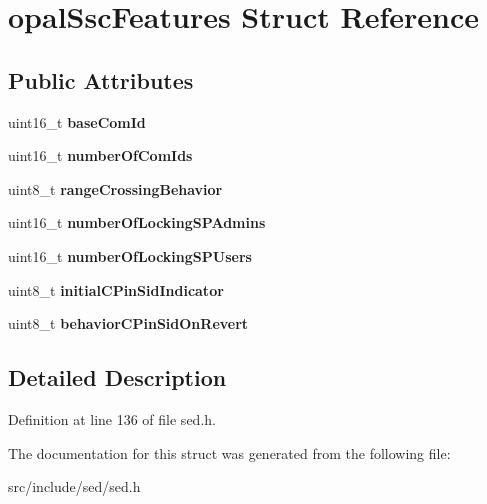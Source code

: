 \hypertarget{structopalSscFeatures}{}\section{opal\+Ssc\+Features Struct Reference}
\label{structopalSscFeatures}
\subsection*{Public Attributes}
\begin{DoxyCompactItemize}
\item 
\hypertarget{structopalSscFeatures_a061eedf0cad03b914e7ee83bfd2abd44}{}uint16\+\_\+t {\bfseries base\+Com\+Id}\label{structopalSscFeatures_a061eedf0cad03b914e7ee83bfd2abd44}

\item 
\hypertarget{structopalSscFeatures_ac41d30d5c9aa034af90885a789f8a1ff}{}uint16\+\_\+t {\bfseries number\+Of\+Com\+Ids}\label{structopalSscFeatures_ac41d30d5c9aa034af90885a789f8a1ff}

\item 
\hypertarget{structopalSscFeatures_a548809557dfa0eb9b372e6af88edf06c}{}uint8\+\_\+t {\bfseries range\+Crossing\+Behavior}\label{structopalSscFeatures_a548809557dfa0eb9b372e6af88edf06c}

\item 
\hypertarget{structopalSscFeatures_a63350d885acb306f26abc9c6c0e47f07}{}uint16\+\_\+t {\bfseries number\+Of\+Locking\+S\+P\+Admins}\label{structopalSscFeatures_a63350d885acb306f26abc9c6c0e47f07}

\item 
\hypertarget{structopalSscFeatures_af3dca8056e1c19e54bc1c721e45b592d}{}uint16\+\_\+t {\bfseries number\+Of\+Locking\+S\+P\+Users}\label{structopalSscFeatures_af3dca8056e1c19e54bc1c721e45b592d}

\item 
\hypertarget{structopalSscFeatures_a43b35f94e48b6e8e531af37549f0e2c5}{}uint8\+\_\+t {\bfseries initial\+C\+Pin\+Sid\+Indicator}\label{structopalSscFeatures_a43b35f94e48b6e8e531af37549f0e2c5}

\item 
\hypertarget{structopalSscFeatures_ae727aae8f69abc4aca4e3d6b95fdc1df}{}uint8\+\_\+t {\bfseries behavior\+C\+Pin\+Sid\+On\+Revert}\label{structopalSscFeatures_ae727aae8f69abc4aca4e3d6b95fdc1df}

\end{DoxyCompactItemize}


\subsection{Detailed Description}


Definition at line 136 of file sed.\+h.



The documentation for this struct was generated from the following file\+:\begin{DoxyCompactItemize}
\item 
src/include/sed/sed.\+h\end{DoxyCompactItemize}

